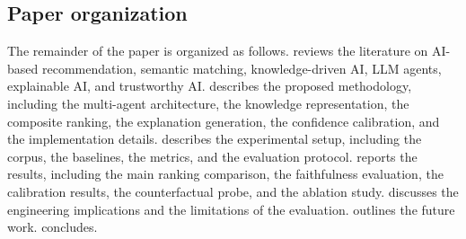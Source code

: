 \subsection{Paper organization}\label{sec:1.8}
The remainder of the paper is organized as follows.
 reviews the literature on AI-based recommendation, semantic matching, knowledge-driven AI, LLM agents, explainable AI, and trustworthy AI.
 describes the proposed methodology, including the multi-agent architecture, the knowledge representation, the composite ranking, the explanation generation, the confidence calibration, and the implementation details.
 describes the experimental setup, including the corpus, the baselines, the metrics, and the evaluation protocol.
 reports the results, including the main ranking comparison, the faithfulness evaluation, the calibration results, the counterfactual probe, and the ablation study.
 discusses the engineering implications and the limitations of the evaluation.
 outlines the future work.
 concludes.

